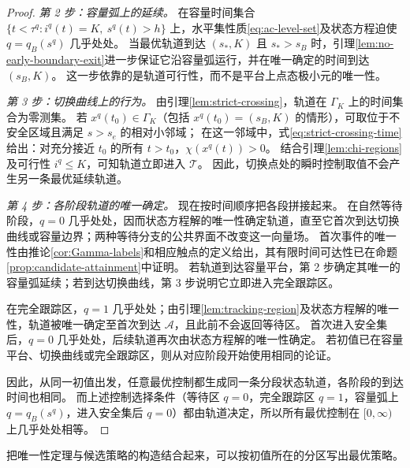 \documentclass[11pt,a4paper,UTF8]{ctexart}
\theoremstyle{definition}
\newcommand{\Acal}{\mathcal A}
\begin{document}
\begin{proof}
\emph{第 2 步：容量弧上的延续。}
在容量时间集合 $\{t<\tau^q:i^q(t)=K,\ s^q(t)>h\}$ 上，水平集性质\eqref{eq:ac-level-set}及状态方程迫使 $q=q_B(s^q)$ 几乎处处。
当最优轨道到达 $(s_*,K)$ 且 $s_*>s_B$ 时，引理\ref{lem:no-early-boundary-exit}进一步保证它沿容量弧运行，并在唯一确定的时间到达 $(s_B,K)$。
这一步依靠的是轨道可行性，而不是平台上点态极小元的唯一性。

\emph{第 3 步：切换曲线上的行为。}
由引理\ref{lem:strict-crossing}，轨道在 $\Gamma_K$ 上的时间集合为零测集。
若 $x^q(t_0)\in\Gamma_K$（包括 $x^q(t_0)=(s_B,K)$ 的情形），可取位于不安全区域且满足 $s>s_e$ 的相对小邻域；
在这一邻域中，式\eqref{eq:strict-crossing-time}给出：对充分接近 $t_0$ 的所有 $t>t_0$，$\chi(x^q(t))>0$。
结合引理\ref{lem:chi-regions}及可行性 $i^q\le K$，可知轨道立即进入 $\mathcal T$。
因此，切换点处的瞬时控制取值不会产生另一条最优延续轨道。

\emph{第 4 步：各阶段轨道的唯一确定。}
现在按时间顺序把各段拼接起来。
在自然等待阶段，$q=0$ 几乎处处，因而状态方程解的唯一性确定轨道，直至它首次到达切换曲线或容量边界；两种等待分支的公共界面不改变这一向量场。
首次事件的唯一性由推论\ref{cor:Gamma-labels}和相应触点的定义给出，其有限时间可达性已在命题\ref{prop:candidate-attainment}中证明。
若轨道到达容量平台，第 2 步确定其唯一的容量弧延续；若到达切换曲线，第 3 步说明它立即进入完全跟踪区。

在完全跟踪区，$q=1$ 几乎处处；由引理\ref{lem:tracking-region}及状态方程解的唯一性，轨道被唯一确定至首次到达 $\Acal$，且此前不会返回等待区。
首次进入安全集后，$q=0$ 几乎处处，后续轨道再次由状态方程解的唯一性确定。
若初值已在容量平台、切换曲线或完全跟踪区，则从对应阶段开始使用相同的论证。

因此，从同一初值出发，任意最优控制都生成同一条分段状态轨道，各阶段的到达时间也相同。
而上述控制选择条件（等待区 $q=0$，完全跟踪区 $q=1$，容量弧上 $q=q_B(s^q)$，进入安全集后 $q=0$）都由轨道决定，所以所有最优控制在 $[0,\infty)$ 上几乎处处相等。
\end{proof}

把唯一性定理与候选策略的构造结合起来，可以按初值所在的分区写出最优策略。
\end{document}
